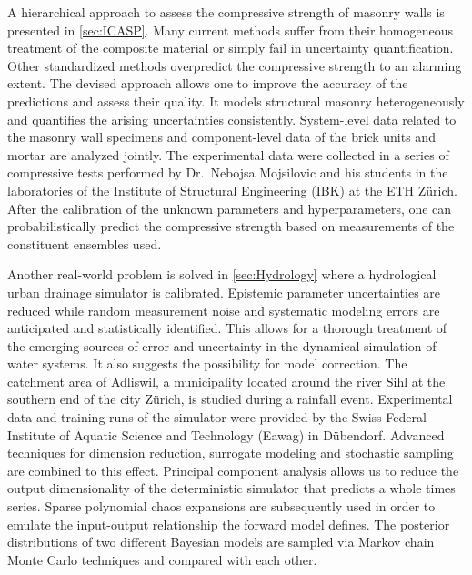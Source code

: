 \begin{refsection}
A hierarchical approach to assess the compressive strength of masonry walls is presented in \cref{sec:ICASP}.
Many current methods suffer from their homogeneous treatment of the composite material or simply fail in uncertainty quantification.
Other standardized methods overpredict the compressive strength to an alarming extent.
The devised approach allows one to improve the accuracy of the predictions and assess their quality.
It models structural masonry heterogeneously and quantifies the arising uncertainties consistently.
System-level data related to the masonry wall specimens and component-level data of the brick units and mortar are analyzed jointly.
The experimental data were collected in a series of compressive tests performed by Dr.\ Nebojsa Mojsilovic and his students
in the laboratories of the Institute of Structural Engineering (IBK) at the ETH Z\"{u}rich.
After the calibration of the unknown parameters and hyperparameters, one can probabilistically predict the compressive strength based on measurements of the constituent ensembles used.
\par %
Another real-world problem is solved in \cref{sec:Hydrology} where a hydrological urban drainage simulator is calibrated.
Epistemic parameter uncertainties are reduced while random measurement noise and systematic modeling errors are anticipated and statistically identified.
This allows for a thorough treatment of the emerging sources of error and uncertainty in the dynamical simulation of water systems.
It also suggests the possibility for model correction.
The catchment area of Adliswil, a municipality located around the river Sihl at the southern end of the city Z\"{u}rich, is studied during a rainfall event.
Experimental data and training runs of the simulator were provided by the Swiss Federal Institute of Aquatic Science and Technology (Eawag) in D\"{u}bendorf.
Advanced techniques for dimension reduction, surrogate modeling and stochastic sampling are combined to this effect.
Principal component analysis allows us to reduce the output dimensionality of the deterministic simulator that predicts a whole times series.
Sparse polynomial chaos expansions are subsequently used in order to emulate the input-output relationship the forward model defines.
The posterior distributions of two different Bayesian models are sampled via Markov chain Monte Carlo techniques and compared with each other.

\end{refsection}